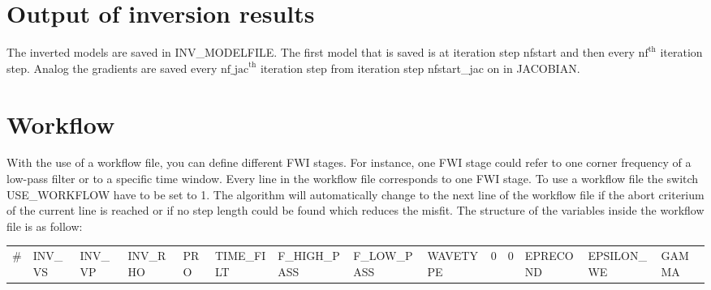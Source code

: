 \section{Output of inversion results}
\label{sec:Output_of_inversion_results_json}
{\color{blue}{\begin{verbatim}
"Output of inverted models" : "comment",
			"INV_MODELFILE" : "model/model_Test",
			"nfstart" : "1",
			"nf" : "1",

"Output of gradients" : "comment",
			"JACOBIAN" : "jacobian/jacobian_Test",
			"nfstart_jac" : "1",
			"nf_jac" : "1",
\end{verbatim}}}

The inverted models are saved in INV\_MODELFILE. The first model that is saved is at iteration step nfstart and then every $\mathrm{nf}^{\mathrm{th}}$ iteration step. Analog the gradients are saved every $\mathrm{nf\_jac}^{\mathrm{th}}$ iteration step from iteration step nfstart\_jac on in JACOBIAN. 

\section{Workflow}
\label{sec:workflow}
{\color{blue}{\begin{verbatim}
"Workflow" : "comment",
			"USE_WORKFLOW" : "1",
			"FILE_WORKFLOW" : "workflow.txt",
\end{verbatim}}}
{\color{red}{\begin{verbatim}
Default values are:
"USE_WORKFLOW" : "0"
\end{verbatim}}}
With the use of a workflow file, you can define different FWI stages. For instance, one FWI stage could refer to one corner frequency of a low-pass filter or to a specific time window. Every line in the workflow file corresponds to one FWI stage. To use a workflow file the switch USE\_WORKFLOW have to be set to 1.  The algorithm will automatically change to the next line of the workflow file if the abort criterium of the current line is reached or if no step length could be found which reduces the misfit. The structure of the variables inside the workflow file is as follow: \\

\noindent
\begin{tabular}{llllllllllIlll}
\# & INV\_VS & INV\_VP & INV\_RHO & PRO & TIME\_FILT & F\_HIGH\_PASS & F\_LOW\_PASS & WAVETYPE & 0 & 0 & EPRECOND & EPSILON\_WE & GAMMA \\
\end{tabular}

